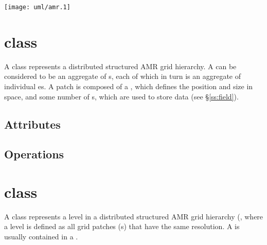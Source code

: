 \centerline{\texttt{[image: uml/amr.1]}}

\section{ class}

A  class represents a distributed structured AMR grid
hierarchy.  A  can be considered to be an aggregate of
s, each of which in turn is an aggregate of individual
es.  A patch is composed of a , which defines
the position and size in space, and some number of s, which
are used to store  data (see \S\ref{ss:field}).



\subsection{Attributes}

\subsection{Operations}

\section{ class}

A  class represents a level in a distributed structured
AMR grid hierarchy (, where a level is defined as all
grid patches (s) that have the same resolution.  A
 is usually contained in a .


